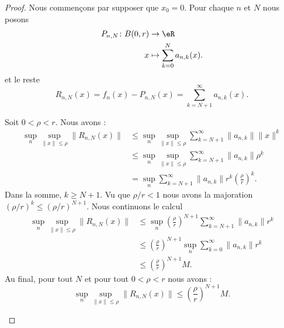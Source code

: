 \begin{proof}
	Nous commençons par supposer que \( x_0=0\). Pour chaque \( n\) et \( N\) nous posons
	\begin{equation}
		\begin{aligned}
			P_{n,N}\colon B(0,r) & \to \eR                         \\
			x                    & \mapsto \sum_{k=0}^Na_{n,k}(x).
		\end{aligned}
	\end{equation}
	et le reste
	\begin{equation}
		R_{n,N}(x)=f_n(x)-P_{n,N}(x)=\sum_{k=N+1}^{\infty}a_{n,k}(x).
	\end{equation}
	\begin{subproof}
		Soit \( 0<\rho<r\). Nous avons :
		\begin{subequations}
			\begin{align}
				\sup_n\sup_{\| x \|\leq \rho}\| R_{n,N}(x) \| & \leq \sup_n\sup_{\| x \|\leq \rho}\sum_{k=N+1}^{\infty}\| a_{n,k} \|\| x \|^k     \\
				                                              & \leq\sup_n\sup_{\| x \|\leq \rho}\sum_{k=N+1}^{\infty}\| a_{n,k} \|\rho^k         \\
				                                              & = \sup_n\sum_{k=N+1}^{\infty}\| a_{n,k} \|r^k\left( \frac{ \rho }{ r } \right)^k.
			\end{align}
		\end{subequations}
		Dans la somme, \( k\geq N+1\). Vu que \( \rho/r<1\) nous avons la majoration \( (\rho/r)^k\leq (\rho/r)^{N+1}\). Nous continuons le calcul
		\begin{subequations}
			\begin{align}
				\sup_n\sup_{\| x \|\leq \rho}\| R_{n,N}(x) \| & \leq \sup_n\left( \frac{ \rho }{ r } \right)^{N+1}\sum_{k=N+1}^{\infty}\| a_{n,k} \|r^k \\
				                                              & \leq \left( \frac{ \rho }{ r } \right)^{N+1}\sup_n\sum_{k=0}^{\infty}\| a_{n,k} \|r^k   \\
				                                              & \leq \left( \frac{ \rho }{ r } \right)^{N+1}M.
			\end{align}
		\end{subequations}
		Au final, pour tout \( N\) et pour tout \( 0<\rho<r\) nous avons :
		\begin{equation}		\label{EQooNBYDooQRWbaF}
			\sup_n\sup_{\| x \|\leq \rho}\| R_{n,N}(x) \| \leq  \left( \frac{ \rho }{ r } \right)^{N+1}M.
		\end{equation}


\end{subproof}
\end{proof}
